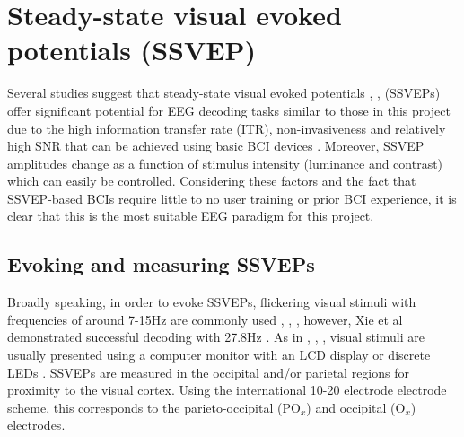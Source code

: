 \section{Steady-state visual evoked potentials (SSVEP)}
Several studies suggest that steady-state visual evoked potentials  \cite{Fernandez-Fraga2016}, \cite{Kanoga2020}, \cite{acampora-dataset} (SSVEPs) offer significant potential for EEG decoding tasks similar to those in this project due to the high information transfer rate (ITR), non-invasiveness and relatively high SNR that can be achieved using basic BCI devices \cite{Zhu2021}. Moreover, SSVEP amplitudes change as a function of stimulus intensity (luminance and contrast) \cite{autthasan-single-chan-ssvep} which can easily be controlled. Considering these factors and the fact that SSVEP-based BCIs require little to no user training or prior BCI experience, it is clear that this is the most suitable EEG paradigm for this project. 

\subsection{Evoking and measuring SSVEPs}
\label{subsection:evoking-measuring-ssveps}

Broadly speaking, in order to evoke SSVEPs, flickering visual stimuli with frequencies of around 7-15Hz are commonly used \cite{acampora-dataset}, \cite{Chen2017}, \cite{duart-comparing-ssvep-stimuli}, however, Xie et al demonstrated successful decoding with 27.8Hz \cite{Xie2016}. As in \cite{acampora-dataset}, \cite{Chen2017}, \cite{autthasan-single-chan-ssvep}, visual stimuli are usually presented using a computer monitor with an LCD display or discrete LEDs \cite{chai-embedded-bci}. SSVEPs are measured in the occipital and/or parietal regions \cite{Fernandez-Fraga2016} for proximity to the visual cortex. Using the international 10-20 electrode electrode scheme, this corresponds to the parieto-occipital ($\text{PO}_x$) and occipital ($\text{O}_x$)  electrodes.

